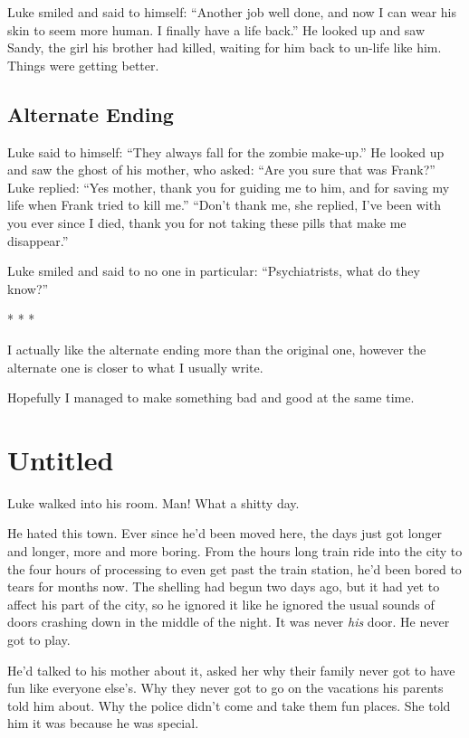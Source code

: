 Luke smiled and said to himself: ``Another job well done, and
now I can wear his skin to seem more human. I finally have a life
back.'' He looked up and saw Sandy, the girl his brother had
killed, waiting for him back to un-life like him. Things were
getting better.

\section*{Alternate Ending}

Luke said to himself: ``They always fall for the zombie
make-up.'' He looked up and saw the ghost of his mother, who
asked: ``Are you sure that was Frank?'' Luke replied:
``Yes mother, thank you for guiding me to him, and for saving
my life when Frank tried to kill me.'' ``Don't
thank me, she replied, I've been with you ever since I died,
thank you for not taking these pills that make me
disappear.''

Luke smiled and said to no one in particular: ``Psychiatrists,
what do they know?''

* * *


I actually like the alternate ending more than the original one,
however the alternate one is closer to what I usually write.



Hopefully I managed to make something bad and good at the same
time. 
 



\chapter{Untitled}


Luke walked into his room. Man! What a shitty day.



He hated this town. Ever since he'd been moved here, the days just
got longer and longer, more and more boring. From the hours long
train ride into the city to the four hours of processing to even
get past the train station, he'd been bored to tears for months
now. The shelling had begun two days ago, but it had yet to affect
his part of the city, so he ignored it like he ignored the usual
sounds of doors crashing down in the middle of the night. It was
never {\em his} door. He never got to play.



He'd talked to his mother about it, asked her why their family
never got to have fun like everyone else's. Why they never got to
go on the vacations his parents told him about. Why the police
didn't come and take them fun places. She told him it was because
he was special.



